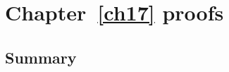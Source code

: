 \chapter{Chapter~\ref{ch17} proofs}

\newpage
\section{Summary}\label{ch17.ps.summary}
\lpscriptsummary
